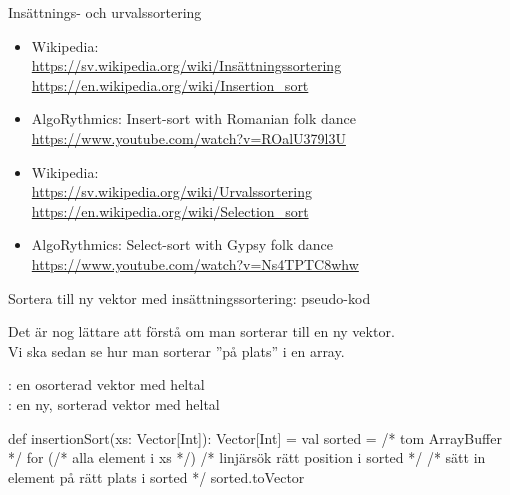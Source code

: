\begin{Slide}{Insättnings- och urvalssortering}
\begin{itemize}
\item Wikipedia:\\
{\SlideFontSmall\url{https://sv.wikipedia.org/wiki/Insättningssortering}}\\
{\SlideFontSmall\url{https://en.wikipedia.org/wiki/Insertion_sort}}

\item AlgoRythmics: Insert-sort with Romanian folk dance\\
{\SlideFontSmall\url{https://www.youtube.com/watch?v=ROalU379l3U}}
\end{itemize}

\vspace{1em}

\noindent{}

\begin{itemize}
\item Wikipedia:\\ 
{\SlideFontSmall\url{https://sv.wikipedia.org/wiki/Urvalssortering}}\\
{\SlideFontSmall\url{https://en.wikipedia.org/wiki/Selection_sort}}

\item AlgoRythmics: Select-sort with Gypsy folk dance \\ 
{\SlideFontSmall\url{https://www.youtube.com/watch?v=Ns4TPTC8whw}}
\end{itemize}
\end{Slide}




\begin{Slide}{Sortera till ny vektor med insättningssortering: pseudo-kod}

{\SlideFontSmall Det är nog lättare att förstå  om man sorterar till en ny vektor. \\ Vi ska sedan se hur man sorterar ''på plats''  i en  array.\\} \vspace{0.5em}

\noindent {}: en osorterad vektor med heltal \\
: en ny, sorterad vektor med heltal
\begin{Code}
def insertionSort(xs: Vector[Int]): Vector[Int] = {
  val sorted = /* tom ArrayBuffer */
  for (/* alla element i xs */) {
     /* linjärsök rätt position i sorted */
     /* sätt in element på rätt plats i sorted */
  }
  sorted.toVector
}
\end{Code}
\end{Slide}


